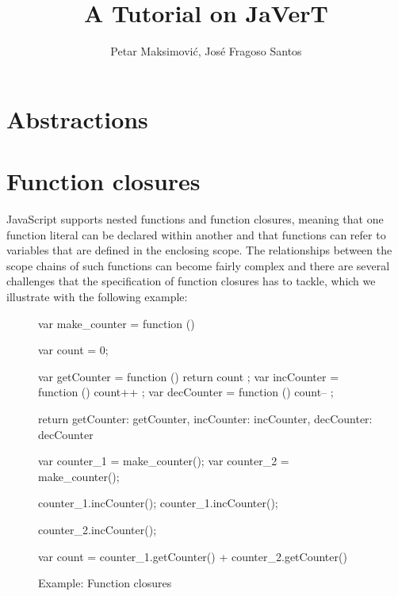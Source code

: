 \documentclass{llncs}
\begin{document}
\title{A Tutorial on JaVerT}

\author{Petar Maksimovi\'{c}, Jos\'{e} Fragoso Santos}


\maketitle

\section{Abstractions}

\newpage
\section{Function closures}
\label{sec:closures}

JavaScript supports nested functions and function closures, meaning that one function literal can be declared within another and that functions can refer to variables that are defined in the enclosing scope. 
The relationships between the scope chains of such functions can become fairly complex and there are several challenges that the specification of function closures has to tackle, which we illustrate with the following example:

\begin{figure}[!h]
\centering
\begin{minipage}{0.75\textwidth}
\begin{lstjs}[firstnumber=1]
var make_counter = function () {
   var count = 0;

   var getCounter = function () { return count };
   var incCounter = function () { count++ };
   var decCounter = function () { count-- };

   return { getCounter: getCounter, incCounter: incCounter, decCounter: decCounter }
}

var counter_1 = make_counter();
var counter_2 = make_counter();

counter_1.incCounter();
counter_1.incCounter();

counter_2.incCounter();

var count = counter_1.getCounter() + counter_2.getCounter()
\end{lstjs}
\end{minipage}
\vspace*{-0.2cm}
\caption{Example: Function closures}
\label{fig:fc}
\end{figure}
\end{document}
